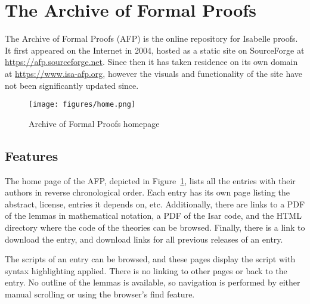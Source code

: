 \documentclass[bsc,frontabs,oneside,singlespacing,parskip,deptreport,logo]{infthesis}
\begin{document}


\section{The Archive of Formal Proofs} \label{afp-background}

The Archive of Formal Proofs (AFP) is the online repository for Isabelle proofs. It first appeared on the Internet in 2004, hosted as a static site on SourceForge at \url{https://afp.sourceforge.net}. Since then it has taken residence on its own domain at \url{https://www.isa-afp.org}, however the visuals and functionality of the site have not been significantly updated since.


\begin{figure}[h]
    \centering
    \texttt{[image: figures/home.png]}
    \caption{Archive of Formal Proofs homepage}
    \label{afpHomePage}
\end{figure}

\subsection{Features} \label{afpFeatures}

The home page of the AFP, depicted in Figure~\ref{afpHomePage}, lists all the entries with their authors in reverse chronological order. Each entry has its own page listing the abstract, license, entries it depends on, etc. Additionally, there are links to a PDF of the lemmas in mathematical notation, a PDF of the Isar code, and the HTML directory where the code of the theories can be browsed. Finally, there is a link to download the entry, and download links for all previous releases of an entry.

\cbstart
The scripts of an entry can be browsed, and these pages display the script with syntax highlighting applied. There is no linking to other pages or back to the entry. No outline of the lemmas is available, so navigation is performed by either manual scrolling or using the browser's find feature. \cbend
\end{document}
